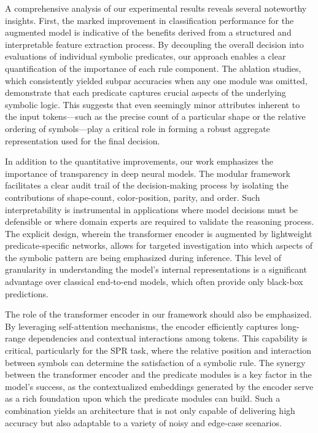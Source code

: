 \documentclass{article}
\begin{document}
A comprehensive analysis of our experimental results reveals several noteworthy insights. First, the marked improvement in classification performance for the augmented model is indicative of the benefits derived from a structured and interpretable feature extraction process. By decoupling the overall decision into evaluations of individual symbolic predicates, our approach enables a clear quantification of the importance of each rule component. The ablation studies, which consistently yielded subpar accuracies when any one module was omitted, demonstrate that each predicate captures crucial aspects of the underlying symbolic logic. This suggests that even seemingly minor attributes inherent to the input tokens—such as the precise count of a particular shape or the relative ordering of symbols—play a critical role in forming a robust aggregate representation used for the final decision.

In addition to the quantitative improvements, our work emphasizes the importance of transparency in deep neural models. The modular framework facilitates a clear audit trail of the decision-making process by isolating the contributions of shape-count, color-position, parity, and order. Such interpretability is instrumental in applications where model decisions must be defensible or where domain experts are required to validate the reasoning process. The explicit design, wherein the transformer encoder is augmented by lightweight predicate-specific networks, allows for targeted investigation into which aspects of the symbolic pattern are being emphasized during inference. This level of granularity in understanding the model’s internal representations is a significant advantage over classical end-to-end models, which often provide only black-box predictions.

The role of the transformer encoder in our framework should also be emphasized. By leveraging self-attention mechanisms, the encoder efficiently captures long-range dependencies and contextual interactions among tokens. This capability is critical, particularly for the SPR task, where the relative position and interaction between symbols can determine the satisfaction of a symbolic rule. The synergy between the transformer encoder and the predicate modules is a key factor in the model’s success, as the contextualized embeddings generated by the encoder serve as a rich foundation upon which the predicate modules can build. Such a combination yields an architecture that is not only capable of delivering high accuracy but also adaptable to a variety of noisy and edge-case scenarios.
\end{document}
